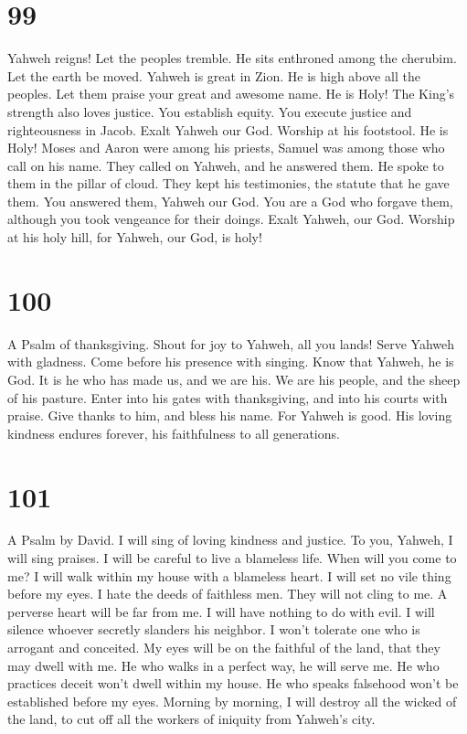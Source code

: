 \hypertarget{section-91}{%
\section{99}\label{section-91}}

 Yahweh reigns! Let the peoples tremble. He sits enthroned
among the cherubim. Let the earth be moved.  Yahweh is
great in Zion. He is high above all the peoples.  Let them
praise your great and awesome name. He is Holy!  The
King's strength also loves justice. You establish equity. You execute
justice and righteousness in Jacob.  Exalt Yahweh our God.
Worship at his footstool. He is Holy!  Moses and Aaron
were among his priests, Samuel was among those who call on his name.
They called on Yahweh, and he answered them.  He spoke to
them in the pillar of cloud. They kept his testimonies, the statute that
he gave them.  You answered them, Yahweh our God. You are
a God who forgave them, although you took vengeance for their doings.
 Exalt Yahweh, our God. Worship at his holy hill, for
Yahweh, our God, is holy!

\hypertarget{section-92}{%
\section{100}\label{section-92}}

A Psalm of thanksgiving.  Shout for joy to Yahweh, all you
lands!  Serve Yahweh with gladness. Come before his
presence with singing.  Know that Yahweh, he is God. It is
he who has made us, and we are his. We are his people, and the sheep of
his pasture.  Enter into his gates with thanksgiving, and
into his courts with praise. Give thanks to him, and bless his name.
 For Yahweh is good. His loving kindness endures forever,
his faithfulness to all generations.

\hypertarget{section-93}{%
\section{101}\label{section-93}}

A Psalm by David.  I will sing of loving kindness and
justice. To you, Yahweh, I will sing praises.  I will be
careful to live a blameless life. When will you come to me? I will walk
within my house with a blameless heart.  I will set no
vile thing before my eyes. I hate the deeds of faithless men. They will
not cling to me.  A perverse heart will be far from me. I
will have nothing to do with evil.  I will silence whoever
secretly slanders his neighbor. I won't tolerate one who is arrogant and
conceited.  My eyes will be on the faithful of the land,
that they may dwell with me. He who walks in a perfect way, he will
serve me.  He who practices deceit won't dwell within my
house. He who speaks falsehood won't be established before my eyes.
 Morning by morning, I will destroy all the wicked of the
land, to cut off all the workers of iniquity from Yahweh's city.

